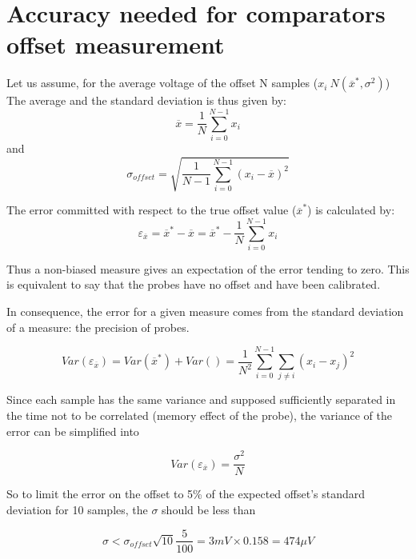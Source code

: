 
\chapter{Accuracy needed for comparators offset measurement}
\label{app:acc-offset}

Let us assume, for the average voltage of the offset N samples ($x_i ~ N(\overline{x}^*, \sigma^2)$) The average and the standard deviation is thus given by:
\begin{equation}
    \overline{x} = \frac{1}{N}\sum_{i=0}^{N-1}{x_i}
\end{equation}
and
\begin{equation}
    \sigma_{offset} = \sqrt{\frac{1}{N-1}\sum_{i=0}^{N-1}{(x_i - \overline{x})^2}}
\end{equation}

The error committed with respect to the true offset value ($\overline{x}^*$) is calculated by:
\begin{equation}
    \varepsilon_{\overline{x}} = \overline{x}^*-\overline{x} = \overline{x}^* - \frac{1}{N}\sum_{i=0}^{N-1}{x_i}
\end{equation}

Thus a non-biased measure gives an expectation of the error tending to zero. This is equivalent to say that
the probes have no offset and have been calibrated.

In consequence, the error for a given measure comes from the standard deviation of a measure: the
precision of probes.

\begin{equation}
    Var\left(\varepsilon_{\overline{x}}\right) = Var\left(\overline{x}^*\right) + Var\left( \right) = \frac{1}{N^2} \sum_{i=0}^{N-1}{\sum_{j\neq i}{(x_i-x_j)^2}}
\end{equation}

Since each sample has the same variance and supposed sufficiently separated in the time not to be
correlated (memory effect of the probe), the variance of the error can be simplified into

\begin{equation}
    Var\left(\varepsilon_{\overline{x}}\right) = \frac{\sigma^2}{N}
\end{equation}

So to limit the error on the offset to 5\% of the expected offset’s standard deviation for 10 samples, the $\sigma$
should be less than

\begin{equation}
    \sigma < \sigma_{offset} \sqrt{10}\frac{5}{100} = 3 mV \times 0.158 = 474 \mu V
\end{equation}